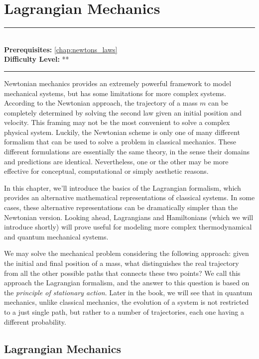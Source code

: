 \documentclass[book.tex]{subfiles}
\begin{document}
\chapter{Lagrangian Mechanics}
\label{chap:lagrangian_mechanics}
\noindent\rule{11cm}{0.4pt} \\
\textbf{Prerequisites:} \autoref{chap:newtons_laws} \\
\textbf{Difficulty Level:} ** \\
\noindent\rule{11cm}{0.4pt}
\vspace{5mm}


Newtonian mechanics provides an extremely powerful framework to model mechanical systems, but has some limitations for more complex systems.
According to the Newtonian approach, the trajectory of a mass $m$ can be completely determined by solving the second law given an initial position and velocity. This framing may not be the most convenient to solve a complex physical system. Luckily, the Newtonian scheme is only one of many different formalism that can be used to solve a problem in classical mechanics. These different formulations are essentially the same theory, in the sense their domains and predictions are identical. Nevertheless, one or the other may be more effective for conceptual, computational or simply aesthetic reasons. 

In this chapter, we'll introduce the basics of the Lagrangian formalism, which provides an alternative mathematical representations of classical systems. In some cases, these alternative representations can be dramatically simpler than the Newtonian version. Looking ahead, Lagrangians and Hamiltonians (which we will introduce shortly) will prove useful for modeling more complex thermodynamical and quantum mechanical systems.

We may solve the mechanical problem considering the following approach: given the initial and final position of a mass, what distinguishes the real trajectory from all the other possible paths that connects these two points? We call this approach the Lagrangian formalism, and the answer to this question is based on the \textit{principle of stationary
action}.  Later in the book, we will see that in quantum mechanics, unlike classical mechanics, the evolution of a system is not restricted to a just single path, but rather to a number of trajectories, each one having a different probability.

\section{Lagrangian Mechanics}
\end{document}
